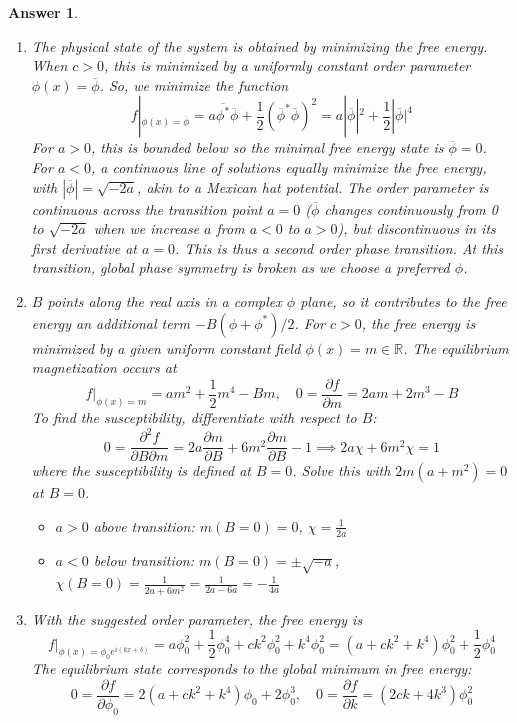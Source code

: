 \documentclass[a4paper]{article}
\newtheorem{ans}{Answer}[section]
\theoremstyle{new}
\begin{document}
\begin{ans}\leavevmode
\begin{enumerate}[label=(\alph*)]
\item The physical state of the system is obtained by minimizing the free energy. When $c>0$, this is minimized by a uniformly constant order parameter $\phi(x)=\overline{\phi}$. So, we minimize the function
$$f|_{\phi(x)=\overline{\phi}}=a\overline{\phi^*}\overline{\phi}+\frac{1}{2}(\overline{\phi}^*\overline{\phi})^2=a|\overline{\phi}|^2+\frac{1}{2}|\overline{\phi}|^4$$
For $a>0$, this is bounded below so the minimal free energy state is $\overline{\phi}=0$. For $a<0$, a continuous line of solutions equally minimize the free energy, with $|\overline{\phi}|=\sqrt{-2a}$, akin to a Mexican hat potential. The order parameter is continuous across the transition point $a=0$ ($\overline{\phi}$ changes continuously from 0 to $\sqrt{-2a}$ when we increase $a$ from $a<0$ to $a>0$), but discontinuous in its first derivative at $a=0$. This is thus a second order phase transition. At this transition, global phase symmetry is broken as we choose a preferred $\phi$.
\item $B$ points along the real axis in a complex $\phi$ plane, so it contributes to the free energy an additional term $-B(\phi+\phi^*)/2$. For $c>0$, the free energy is minimized by a given uniform constant field $\phi(x)=m\in\mathbb{R}$. The equilibrium magnetization occurs at
$$f|_{\phi(x)=m}=am^2+\frac{1}{2}m^4-Bm,\quad 0=\frac{\partial f}{\partial m}=2am+2m^3-B$$
To find the susceptibility, differentiate with respect to $B$:
$$0=\frac{\partial^2f}{\partial B\partial m}=2a\frac{\partial m}{\partial B}+6m^2\frac{\partial m}{\partial B}-1\implies 2a\chi+6m^2\chi=1$$
where the susceptibility is defined at $B=0$. Solve this with $2m(a+m^2)=0$ at $B=0$. 
\begin{itemize}
    \item $a>0$ above transition: $m(B=0)=0$, $\chi=\frac{1}{2a}$
    \item $a<0$ below transition: $m(B=0)=\pm\sqrt{-a}$, $\chi(B=0)=\frac{1}{2a+6m^2}=\frac{1}{2a-6a}=-\frac{1}{4a}$
\end{itemize}
\item With the suggested order parameter, the free energy is
$$f|_{\phi(x)=\phi_0e^{i(kx+\delta)}}=a\phi_0^2+\frac{1}{2}\phi_0^4+ck^2\phi_0^2+k^4\phi_0^2=(a+ck^2+k^4)\phi_0^2+\frac{1}{2}\phi_0^4$$
The equilibrium state corresponds to the global minimum in free energy:
$$0=\frac{\partial f}{\partial\phi_0}=2(a+ck^2+k^4)\phi_0+2\phi_0^3,\quad 0=\frac{\partial f}{\partial k}=(2ck+4k^3)\phi_0^2$$

\end{enumerate}
\end{ans}
\end{document}
